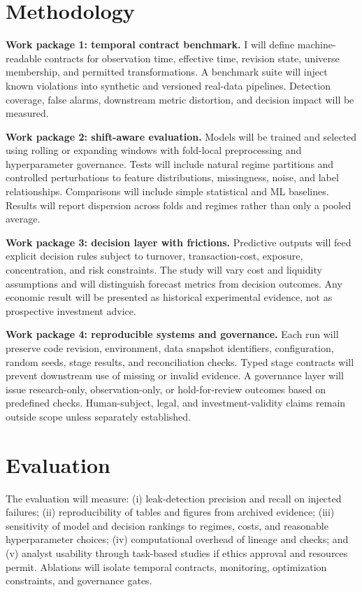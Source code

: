 \documentclass[11pt]{article}
\begin{document}
\section*{Methodology}
\textbf{Work package 1: temporal contract benchmark.} I will define machine-readable contracts for observation time, effective time, revision state, universe membership, and permitted transformations. A benchmark suite will inject known violations into synthetic and versioned real-data pipelines. Detection coverage, false alarms, downstream metric distortion, and decision impact will be measured.

\textbf{Work package 2: shift-aware evaluation.} Models will be trained and selected using rolling or expanding windows with fold-local preprocessing and hyperparameter governance. Tests will include natural regime partitions and controlled perturbations to feature distributions, missingness, noise, and label relationships. Comparisons will include simple statistical and ML baselines. Results will report dispersion across folds and regimes rather than only a pooled average.

\textbf{Work package 3: decision layer with frictions.} Predictive outputs will feed explicit decision rules subject to turnover, transaction-cost, exposure, concentration, and risk constraints. The study will vary cost and liquidity assumptions and will distinguish forecast metrics from decision outcomes. Any economic result will be presented as historical experimental evidence, not as prospective investment advice.

\textbf{Work package 4: reproducible systems and governance.} Each run will preserve code revision, environment, data snapshot identifiers, configuration, random seeds, stage results, and reconciliation checks. Typed stage contracts will prevent downstream use of missing or invalid evidence. A governance layer will issue research-only, observation-only, or hold-for-review outcomes based on predefined checks. Human-subject, legal, and investment-validity claims remain outside scope unless separately established.

\section*{Evaluation}
The evaluation will measure: (i) leak-detection precision and recall on injected failures; (ii) reproducibility of tables and figures from archived evidence; (iii) sensitivity of model and decision rankings to regimes, costs, and reasonable hyperparameter choices; (iv) computational overhead of lineage and checks; and (v) analyst usability through task-based studies if ethics approval and resources permit. Ablations will isolate temporal contracts, monitoring, optimization constraints, and governance gates.
\end{document}

